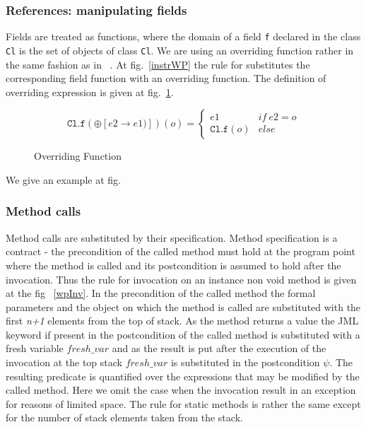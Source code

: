 \subsubsection{References: manipulating fields}
Fields are treated as functions, where the domain of a field \texttt{f} 
declared in the class \texttt{Cl} is the set of objects of class \texttt{Cl}.
We are using an overriding function rather in the same fashion as in ~\cite{B00ppp}. 
At fig.~\ref{instrWP} the rule for  substitutes the corresponding field function with an overriding function. The definition of overriding expression is given at fig.~\ref{override}.

\begin{figure}
$$
 \texttt{Cl.f}(\oplus[e2 \rightarrow e1)])(o) = \left\{ \begin{array} {ll}
						       e1 & if \ e2 = o \\
					               \texttt{Cl.f}(o)	& else 
	\end{array}\right. 
$$ 
\caption{Overriding Function}
\label{override}
\end{figure}
We give an example at fig.  %


\subsubsection{Method calls}
Method calls are substituted by their specification. Method specification is a contract - the precondition of the called method
must hold at the program point where the method is called and its postcondition is assumed to hold after the invocation. Thus the rule for
invocation on an instance non void method is given at the fig ~\ref{wpInv}. In the precondition of the called method the formal parameters and the object on which the method is called are substituted with the first \textit{n+1} elements from the top of stack. As the method returns a value the JML keyword 
 if present in the postcondition of the called method is substituted with a fresh variable $fresh\_var$ and as the result is put after the execution of the invocation at the top stack $fresh\_var$ is substituted in the postcondition $\psi$. The resulting predicate is quantified over the 
expressions that may be modified by the called method. Here we omit the case when the invocation result in an exception for reasons of limited space. 
The rule for static methods is rather the same except for the number of stack elements taken from the stack.  

